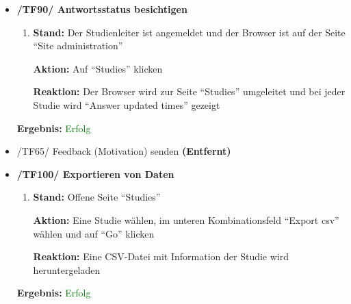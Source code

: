 \documentclass[a4paper]{scrreprt}
\begin{document}
\begin{itemize}
		
		                      \item \textbf{/TF90/ Antwortsstatus besichtigen}
		                          \begin{enumerate}
		                              \item \par \textbf{Stand: } Der Studienleiter ist angemeldet und der Browser ist auf der Seite ``Site administration''
		                                    \par \textbf{Aktion: }Auf ``Studies'' klicken
		                                    \par \textbf{Reaktion: }Der Browser wird zur Seite ``Studies'' umgeleitet und bei jeder Studie wird ``Answer updated times'' gezeigt
		                          \end{enumerate}		
		      					\vspace*{0.3cm}
		      		           \par \textbf{Ergebnis: }\textcolor{green}{Erfolg}
		      		           \vspace*{0.6cm} 	
		      		
		      				\item /TF65/ Feedback (Motivation) senden \textbf{(Entfernt)}	
		      				\vspace*{0.6cm}	
		      				
		                      \item \textbf{/TF100/ Exportieren von Daten}
		                      \begin{enumerate}
		                          \item \par \textbf{Stand: }Offene Seite ``Studies''
		                                \par \textbf{Aktion: }Eine Studie w\"ahlen, im unteren Kombinationsfeld ``Export csv'' w\"ahlen und auf ``Go'' klicken
		                                \par \textbf{Reaktion: }Eine CSV-Datei mit Information der Studie wird heruntergeladen
		                      \end{enumerate}	
		      					\vspace*{0.3cm}
		      		           \par \textbf{Ergebnis: }\textcolor{green}{Erfolg}
		      		           \vspace*{0.6cm}                 			
		      		
		      		           \end{itemize}
	
\end{document}
